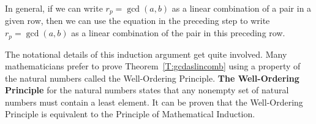 In general,  if we can write  $r_p  = \gcd( {a, b} )$
 as a linear combination of a pair in a given row, then we can use the equation in the preceding step to write  $r_p  = \gcd( {a, b} )$ as a linear combination of the pair in this preceding row.

The notational details of this induction argument get quite involved.  Many mathematicians prefer to prove Theorem~\ref{T:gcdaslincomb} using a property of the natural numbers called the Well-Ordering Principle.  \textbf{The Well-Ordering Principle}
%
 for the natural numbers states that any nonempty set of natural numbers must contain a least element.  It can be proven that the Well-Ordering Principle is equivalent to the Principle of Mathematical Induction.
\hbreak

%
%
%
%
%
%
%
%


\endinput
